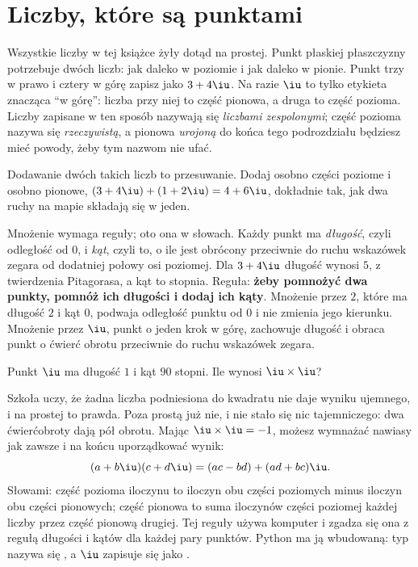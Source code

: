 \section{Liczby, które są punktami}
\label{sec:ch12-plane}

\noindent
Wszystkie liczby w tej książce żyły dotąd na prostej. Punkt płaskiej
płaszczyzny potrzebuje dwóch liczb: jak daleko w poziomie i jak daleko w
pionie. Punkt trzy w prawo i cztery w górę zapisz jako $3 + 4\iu$. Na razie
$\iu$ to tylko etykieta znacząca \enquote{w górę}: liczba przy niej to część
pionowa, a druga to część pozioma. Liczby zapisane w ten sposób nazywają się
\emph{liczbami zespolonymi}; część pozioma nazywa się \emph{rzeczywistą}, a
pionowa \emph{urojoną} \dash{} do końca tego podrozdziału będziesz mieć
powody, żeby tym nazwom nie ufać.

Dodawanie dwóch takich liczb to przesuwanie. Dodaj osobno części poziome i
osobno pionowe, $(3 + 4\iu) + (1 + 2\iu) = 4 + 6\iu$, dokładnie tak, jak dwa
ruchy na mapie składają się w jeden.

Mnożenie wymaga reguły; oto ona w słowach. Każdy punkt ma \emph{długość},
czyli odległość od $0$, i \emph{kąt}, czyli to, o ile jest obrócony
przeciwnie do ruchu wskazówek zegara od dodatniej połowy osi poziomej. Dla
$3 + 4\iu$ długość wynosi $5$, z twierdzenia Pitagorasa, a kąt to
 stopnia. Reguła: \textbf{żeby pomnożyć dwa punkty, pomnóż
ich długości i dodaj ich kąty}. Mnożenie przez $2$, które ma długość $2$ i
kąt $0$, podwaja odległość punktu od $0$ i nie zmienia jego kierunku.
Mnożenie przez $\iu$, punkt o jeden krok w górę, zachowuje długość i obraca
punkt o ćwierć obrotu przeciwnie do ruchu wskazówek zegara.

\begin{think}
Punkt $\iu$ ma długość $1$ i kąt $90$ stopni. Ile wynosi $\iu \times \iu$?
\end{think}
Szkoła uczy, że żadna liczba podniesiona do kwadratu nie daje wyniku
ujemnego, i na prostej to prawda. Poza prostą już nie, i nie stało się nic
tajemniczego: dwa ćwierćobroty dają pół obrotu. Mając $\iu \times \iu = -1$,
możesz wymnażać nawiasy jak zawsze i na końcu uporządkować wynik:
\[ (a + b\iu)(c + d\iu) = (ac - bd) + (ad + bc)\iu . \]
Słowami: część pozioma iloczynu to iloczyn obu części poziomych minus
iloczyn obu części pionowych; część pionowa to suma iloczynów części
poziomej każdej liczby przez część pionową drugiej. Tej reguły używa
komputer i zgadza się ona z regułą długości i kątów dla każdej pary
punktów. Python ma ją wbudowaną: typ nazywa się , a $\iu$
zapisuje się jako .

